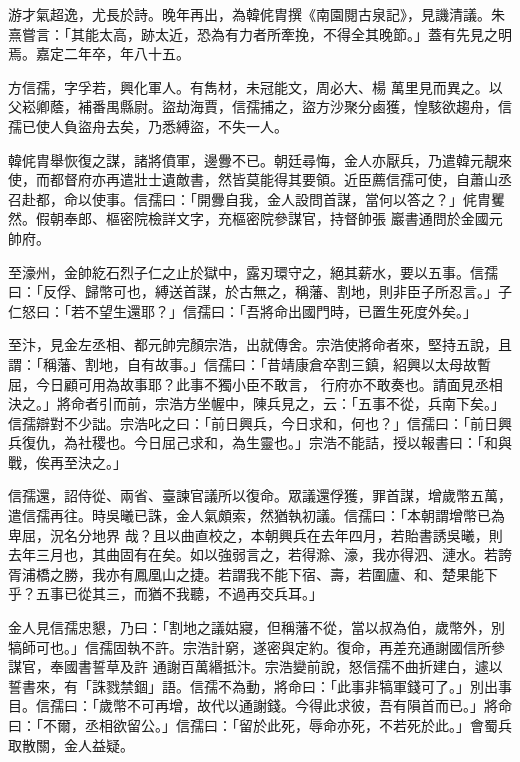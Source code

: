 \begin{pinyinscope}
 游才氣超逸，尤長於詩。晚年再出，為韓侂胄撰《南園閱古泉記》，見譏清議。朱熹嘗言：「其能太高，跡太近，恐為有力者所牽挽，不得全其晚節。」蓋有先見之明焉。嘉定二年卒，年八十五。



 方信孺，字孚若，興化軍人。有雋材，未冠能文，周必大、楊
 萬里見而異之。以父崧卿蔭，補番禺縣尉。盜劫海賈，信孺捕之，盜方沙聚分鹵獲，惶駭欲趨舟，信孺已使人負盜舟去矣，乃悉縛盜，不失一人。



 韓侂胄舉恢復之謀，諸將僨軍，邊釁不已。朝廷尋悔，金人亦厭兵，乃遣韓元靚來使，而都督府亦再遣壯士遺敵書，然皆莫能得其要領。近臣薦信孺可使，自蕭山丞召赴都，命以使事。信孺曰：「開釁自我，金人設問首謀，當何以答之？」侂胄矍然。假朝奉郎、樞密院檢詳文字，充樞密院參謀官，持督帥張
 巖書通問於金國元帥府。



 至濠州，金帥紇石烈子仁之止於獄中，露刃環守之，絕其薪水，要以五事。信孺曰：「反俘、歸幣可也，縛送首謀，於古無之，稱藩、割地，則非臣子所忍言。」子仁怒曰：「若不望生還耶？」信孺曰：「吾將命出國門時，已置生死度外矣。」



 至汴，見金左丞相、都元帥完顏宗浩，出就傳舍。宗浩使將命者來，堅持五說，且謂：「稱藩、割地，自有故事。」信孺曰：「昔靖康倉卒割三鎮，紹興以太母故暫屈，今日顧可用為故事耶？此事不獨小臣不敢言，
 行府亦不敢奏也。請面見丞相決之。」將命者引而前，宗浩方坐幄中，陳兵見之，云：「五事不從，兵南下矣。」信孺辯對不少詘。宗浩叱之曰：「前日興兵，今日求和，何也？」信孺曰：「前日興兵復仇，為社稷也。今日屈己求和，為生靈也。」宗浩不能詰，授以報書曰：「和與戰，俟再至決之。」



 信孺還，詔侍從、兩省、臺諫官議所以復命。眾議還俘獲，罪首謀，增歲幣五萬，遣信孺再往。時吳曦已誅，金人氣頗索，然猶執初議。信孺曰：「本朝謂增幣已為卑屈，況名分地界
 哉？且以曲直校之，本朝興兵在去年四月，若貽書誘吳曦，則去年三月也，其曲固有在矣。如以強弱言之，若得滁、濠，我亦得泗、漣水。若誇胥浦橋之勝，我亦有鳳凰山之捷。若謂我不能下宿、壽，若圍廬、和、楚果能下乎？五事已從其三，而猶不我聽，不過再交兵耳。」



 金人見信孺忠懇，乃曰：「割地之議姑寢，但稱藩不從，當以叔為伯，歲幣外，別犒師可也。」信孺固執不許。宗浩計窮，遂密與定約。復命，再差充通謝國信所參謀官，奉國書誓草及許
 通謝百萬緡抵汴。宗浩變前說，怒信孺不曲折建白，遽以誓書來，有「誅戮禁錮」語。信孺不為動，將命曰：「此事非犒軍錢可了。」別出事目。信孺曰：「歲幣不可再增，故代以通謝錢。今得此求彼，吾有隕首而已。」將命曰：「不爾，丞相欲留公。」信孺曰：「留於此死，辱命亦死，不若死於此。」會蜀兵取散關，金人益疑。




\end{pinyinscope}
